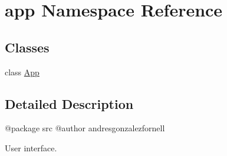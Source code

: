 \hypertarget{namespaceapp}{}\section{app Namespace Reference}
\label{namespaceapp}
\subsection*{Classes}
\begin{DoxyCompactItemize}
\item 
class \hyperlink{classapp_1_1_app}{App}
\end{DoxyCompactItemize}


\subsection{Detailed Description}
\begin{DoxyVerb}@package src
@author andresgonzalezfornell

User interface.
\end{DoxyVerb}
 